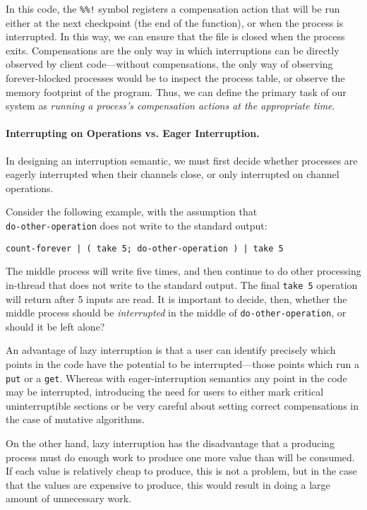 \documentclass[english,preprint,JIP]{ipsj}
\begin{document}
In this code, the \verb/%%!/ symbol registers a compensation action that will be run either at the next checkpoint (the end of the function), or when the process is interrupted. In this way, we can ensure that the file is closed when the process exits. Compensations are the only way in which interruptions can be directly observed by client code---without compensations, the only way of observing forever-blocked processes would be to inspect the process table, or observe the memory footprint of the program. Thus, we can define the primary task of our system as \emph{running a process's compensation actions at the appropriate time}.

\paragraph{Interrupting on Operations vs. Eager Interruption.}

In designing an interruption semantic, we must first decide whether processes are eagerly interrupted when their channels close, or only interrupted on channel operations.

Consider the following example, with the assumption that \\ \verb/do-other-operation/ does not write to the standard output:

\begin{verbatim}
count-forever | ( take 5; do-other-operation ) | take 5
\end{verbatim}

The middle process will write five times, and then continue to do other processing in-thread that does not write to the standard output.
The final \verb/take 5/ operation will return after 5 inputs are read.
It is important to decide, then, whether the middle process should be \emph{interrupted} in the middle of \verb/do-other-operation/, or should it be left alone?

An advantage of lazy interruption is that a user can identify precisely which points in the code have the potential to be interrupted---those points which run a \verb/put/ or a \verb/get/. Whereas with eager-interruption semantics any point in the code may be interrupted, introducing the need for users to either mark critical uninterruptible sections or be very careful about setting correct compensations in the case of mutative algorithms.

On the other hand, lazy interruption has the disadvantage that a producing process must do enough work to produce one more value than will be consumed. If each value is relatively cheap to produce, this is not a problem, but in the case that the values are expensive to produce, this would result in doing a large amount of unnecessary work.
\end{document}
